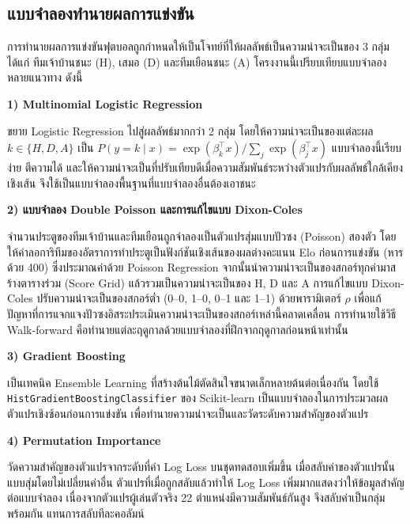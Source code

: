 \subsection{แบบจำลองทำนายผลการแข่งขัน}

การทำนายผลการแข่งขันฟุตบอลถูกกำหนดให้เป็นโจทย์ที่ให้ผลลัพธ์เป็นความน่าจะเป็นของ 3 กลุ่ม ได้แก่ ทีมเจ้าบ้านชนะ (H), เสมอ (D) และทีมเยือนชนะ (A) โครงงานนี้เปรียบเทียบแบบจำลองหลายแนวทาง ดังนี้

\par\noindent\textbf{1) Multinomial Logistic Regression}\par\nopagebreak[4]
ขยาย Logistic Regression ไปสู่ผลลัพธ์มากกว่า 2 กลุ่ม โดยให้ความน่าจะเป็นของแต่ละผล $k \in \{H, D, A\}$ เป็น $P(y = k \mid x) = \exp(\beta_k^\top x) / \sum_{j} \exp(\beta_j^\top x)$ แบบจำลองนี้เรียบง่าย ตีความได้ และให้ความน่าจะเป็นที่ปรับเทียบดีเมื่อความสัมพันธ์ระหว่างตัวแปรกับผลลัพธ์ใกล้เคียงเชิงเส้น จึงใช้เป็นแบบจำลองพื้นฐานที่แบบจำลองอื่นต้องเอาชนะ

\par\noindent\textbf{2) แบบจำลอง Double Poisson และการแก้ไขแบบ Dixon-Coles}\par\nopagebreak[4]
จำนวนประตูของทีมเจ้าบ้านและทีมเยือนถูกจำลองเป็นตัวแปรสุ่มแบบปัวซง (Poisson) สองตัว โดยให้ค่าลอการิทึมของอัตราการทำประตูเป็นฟังก์ชันเชิงเส้นของผลต่างคะแนน Elo ก่อนการแข่งขัน (หารด้วย 400) ซึ่งประมาณค่าด้วย Poisson Regression จากนั้นนำความน่าจะเป็นของสกอร์ทุกค่ามาสร้างตารางร่วม (Score Grid) แล้วรวมเป็นความน่าจะเป็นของ H, D และ A การแก้ไขแบบ Dixon-Coles \cite{dixon1997modelling} ปรับความน่าจะเป็นของสกอร์ต่ำ (0--0, 1--0, 0--1 และ 1--1) ด้วยพารามิเตอร์ $\rho$ เพื่อแก้ปัญหาที่การแจกแจงปัวซงอิสระประเมินความน่าจะเป็นของสกอร์เหล่านี้คลาดเคลื่อน การทำนายใช้วิธี Walk-forward คือทำนายแต่ละฤดูกาลด้วยแบบจำลองที่ฝึกจากฤดูกาลก่อนหน้าเท่านั้น

\par\noindent\textbf{3) Gradient Boosting}\par\nopagebreak[4]
เป็นเทคนิค Ensemble Learning ที่สร้างต้นไม้ตัดสินใจขนาดเล็กหลายต้นต่อเนื่องกัน โดยใช้ \texttt{HistGradientBoostingClassifier} ของ Scikit-learn \cite{scikit-learn} เป็นแบบจำลองในการประมวลผลตัวแปรเชิงซ้อนก่อนการแข่งขัน เพื่อทำนายความน่าจะเป็นและวัดระดับความสำคัญของตัวแปร

\par\noindent\textbf{4) Permutation Importance}\par\nopagebreak[4]
วัดความสำคัญของตัวแปรจากระดับที่ค่า Log Loss บนชุดทดสอบเพิ่มขึ้น เมื่อสลับค่าของตัวแปรนั้นแบบสุ่มโดยไม่เปลี่ยนค่าอื่น ตัวแปรที่เมื่อถูกสลับแล้วทำให้ Log Loss เพิ่มมากแสดงว่าให้ข้อมูลสำคัญต่อแบบจำลอง เนื่องจากตัวแปรผู้เล่นตัวจริง 22 ตำแหน่งมีความสัมพันธ์กันสูง จึงสลับค่าเป็นกลุ่มพร้อมกัน แทนการสลับทีละคอลัมน์

